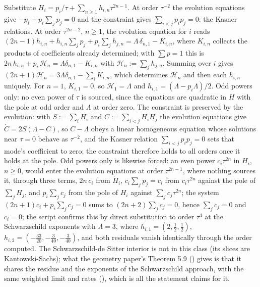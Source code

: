 Substitute $H_i = p_i/\tau + \sum_{n\geq 1}h_{i,n}\tau^{2n-1}$. At order $\tau^{-2}$ the evolution equations give $-p_i + p_i\sum_j p_j = 0$ and the constraint gives $\sum_{i<j}p_ip_j = 0$: the Kasner relations. At order $\tau^{2n-2}$, $n \geq 1$, the evolution equation for $i$ reads $(2n-1)h_{i,n} + h_{i,n}\sum_j p_j + p_i\sum_j h_{j,n} = \Lambda\,\delta_{n,1} - K_{i,n}$, where $K_{i,n}$ collects the products of coefficients already determined; with $\sum p = 1$ this is $2n\,h_{i,n} + p_i\,\mathcal{H}_n = \Lambda\delta_{n,1} - K_{i,n}$ with $\mathcal{H}_n := \sum_j h_{j,n}$. Summing over $i$ gives $(2n+1)\mathcal{H}_n = 3\Lambda\delta_{n,1} - \sum_iK_{i,n}$, which determines $\mathcal{H}_n$ and then each $h_{i,n}$ uniquely. For $n = 1$, $K_{i,1} = 0$, so $\mathcal{H}_1 = \Lambda$ and $h_{i,1} = (\Lambda - p_i\Lambda)/2$. Odd powers only: no even power of $\tau$ is sourced, since the equations are quadratic in $H$ with the pole at odd order and $\Lambda$ at order zero. The constraint is preserved by the evolution: with $S := \sum_iH_i$ and $C := \sum_{i<j}H_iH_j$ the evolution equations give $\dot C = 2S(\Lambda - C)$, so $C - \Lambda$ obeys a linear homogeneous equation whose solutions near $\tau = 0$ behave as $\tau^{-2}$, and the Kasner relation $\sum_{i<j}p_ip_j = 0$ sets that mode's coefficient to zero; the constraint therefore holds to all orders once it holds at the pole. Odd powers only is likewise forced: an even power $c_i\tau^{2n}$ in $H_i$, $n \geq 0$, would enter the evolution equations at order $\tau^{2n-1}$, where nothing sources it, through three terms, $2n\,c_i$ from $\dot H_i$, $c_i\sum_jp_j = c_i$ from $c_i\tau^{2n}$ against the pole of $\sum_jH_j$, and $p_i\sum_jc_j$ from the pole of $H_i$ against $\sum_jc_j\tau^{2n}$; the system $(2n+1)c_i + p_i\sum_jc_j = 0$ sums to $(2n+2)\sum_jc_j = 0$, hence $\sum_jc_j = 0$ and $c_i = 0$; the script confirms this by direct substitution to order $\tau^4$ at the Schwarzschild exponents with $\Lambda = 3$, where $h_{i,1} = (2, \tfrac12, \tfrac12)$, $h_{i,2} = (-\tfrac{33}{20}, -\tfrac{3}{40}, -\tfrac{3}{40})$, and both residuals vanish identically through the order computed. The Schwarzschild-de Sitter interior is not in this class (its slices are Kantowski-Sachs); what the geometry paper's Theorem 5.9 \cite[Thm.~5.9]{ButlerT6} () gives is that it shares the residue and the exponents of the Schwarzschild approach, with the same weighted limit and rates (), which is all the statement claims for it.
